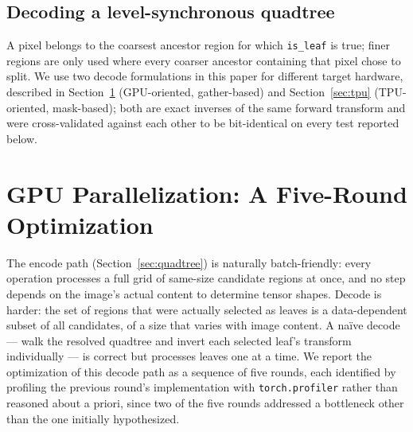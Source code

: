 \documentclass[11pt]{article}
\begin{document}
\subsection{Decoding a level-synchronous quadtree}
\label{sec:decode-formulation}

A pixel belongs to the coarsest ancestor region for which \texttt{is\_leaf}
is true; finer regions are only used where every coarser ancestor containing
that pixel chose to split. We use two decode formulations in this paper for
different target hardware, described in Section~\ref{sec:gpu-opt}
(GPU-oriented, gather-based) and Section~\ref{sec:tpu} (TPU-oriented,
mask-based); both are exact inverses of the same forward transform and were
cross-validated against each other to be bit-identical on every test
reported below.

\section{GPU Parallelization: A Five-Round Optimization}
\label{sec:gpu-opt}

The encode path (Section~\ref{sec:quadtree}) is naturally batch-friendly:
every operation processes a full grid of same-size candidate regions at
once, and no step depends on the image's actual content to determine tensor
shapes. Decode is harder: the set of regions that were actually selected as
leaves is a data-dependent subset of all candidates, of a size that varies
with image content. A na\"ive decode --- walk the resolved quadtree and
invert each selected leaf's transform individually --- is correct but
processes leaves one at a time. We report the optimization of this decode
path as a sequence of five rounds, each identified by profiling the previous
round's implementation with \texttt{torch.profiler} rather than reasoned
about a priori, since two of the five rounds addressed a bottleneck other
than the one initially hypothesized.
\end{document}

